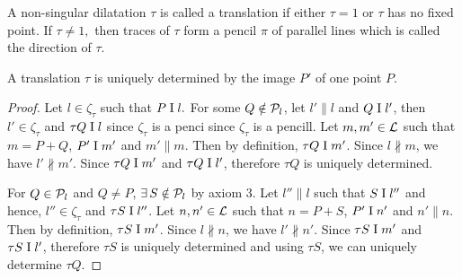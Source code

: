\begin{definition}
    A non-singular dilatation $\tau$ is called a translation if either $\tau = 1$ or $\tau$ has no fixed point. If $\tau \neq 1,$ then traces of $\tau$ form a pencil $\pi$ of parallel lines which is called the direction of $\tau.$
\end{definition}

\begin{theorem}
    A translation $\tau$ is uniquely determined by the image $P'$ of one point $P.$
\end{theorem}

\begin{proof}
    Let $l \in \zeta_\tau$ such that $P \mathrel\text{I} l.$ For some $Q \notin \mathcal{P}_l$, let $l' \parallel l$ and $Q \mathrel\text{I} l'$, then $l' \in \zeta_\tau$ and $\tau Q \mathrel\text{I} l$ since $\zeta_\tau$ is a penci since $\zeta_\tau$ is a pencill.  Let $m,m' \in \mathcal{L}$ such that $m=P+Q$, $P' \mathrel\text{I} m'$ and $m' \parallel m$. Then by definition, $ \tau Q \mathrel\text{I} m'$. Since $l \not \parallel m$, we have $l' \not \parallel m'$. Since $\tau Q \mathrel\text{I} m'$ and $\tau Q \mathrel\text{I} l'$, therefore $\tau Q$ is uniquely determined.

    \vspace{1ex}

    For $Q \in \mathcal{P}_l$ and $Q \neq P$, $\exists\, S \notin \mathcal{P}_{l}$ by axiom 3. Let $l'' \parallel l$ such that $S \mathrel\text{I} l''$ and hence, $l'' \in \zeta_\tau$ and $\tau S \mathrel\text{I} l''$.  Let $n,n' \in \mathcal{L}$ such that $n=P+S$, $P' \mathrel\text{I} n'$ and $n' \parallel n$. Then by definition, $ \tau S \mathrel\text{I} m'$. Since $l \not \parallel n$, we have $l' \not \parallel n'$. Since $\tau S \mathrel\text{I} m'$ and $\tau S \mathrel\text{I} l'$, therefore $\tau S$ is uniquely determined and using $\tau S$, we can uniquely determine $\tau Q$.
\end{proof}

